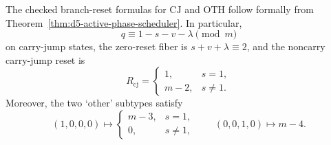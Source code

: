 \begin{corollary}
The checked branch-reset formulas for $\mathrm{CJ}$ and $\mathrm{OTH}$ follow formally from Theorem~\ref{thm:d5-active-phase-scheduler}. In particular,
\[
q\equiv 1-s-v-\lambda \pmod m
\]
on carry-jump states, the zero-reset fiber is $s+v+\lambda\equiv 2$, and the noncarry carry-jump reset is
\[
R_{\mathrm{cj}}=
\begin{cases}
1,& s=1,\\
m-2,& s\neq 1.
\end{cases}
\]
Moreover, the two `other' subtypes satisfy
\[
(1,0,0,0)\mapsto
\begin{cases}
m-3,& s=1,\\
0,& s\neq 1,
\end{cases}
\qquad
(0,0,1,0)\mapsto m-4.
\]
\end{corollary}
